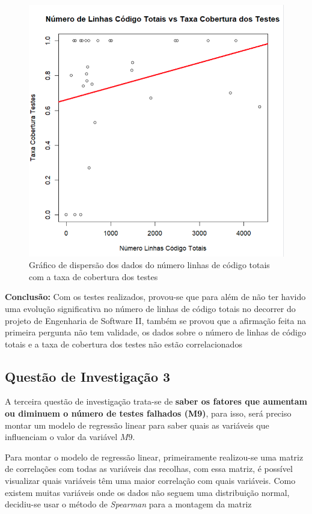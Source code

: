 \documentclass[%
 aip,
cp,  %
 amsmath,amssymb,%
 reprint,%
]{revtex4-2}
\begin{document}
 \begin{figure}[!h]
     \centering
     \includegraphics[width=0.4\linewidth]{imagens//questao2/scatterPlotCorrelacaoPergunta2.png}
     \caption{Gráfico de dispersão dos dados do número linhas de código totais com a taxa de cobertura dos testes}
     \label{fig:ScatterPlotPergunta2}
 \end{figure}
 
\vspace{2cm}

 \textbf{Conclusão:} Com os testes realizados, provou-se que para além de não ter havido uma evolução significativa no número de linhas de código totais no decorrer do projeto de Engenharia de Software II, também se provou que a afirmação feita na primeira pergunta não tem validade, os dados sobre o número de linhas de código totais e a taxa de cobertura dos testes não estão correlacionados


\newpage


\subsection{Questão de Investigação 3}
A terceira questão de investigação trata-se de \textbf{saber os fatores que aumentam ou diminuem o número de testes falhados (M9)}, para isso, será preciso montar um modelo de regressão linear para saber quais as variáveis que influenciam o valor da variável $M9$.


Para montar o modelo de regressão linear, primeiramente realizou-se uma matriz de correlações com todas as variáveis das recolhas, com essa matriz, é possível visualizar quais variáveis têm uma maior correlação com quais variáveis. Como existem muitas variáveis onde os dados não seguem uma distribuição normal, decidiu-se usar o método de \textit{Spearman} para a montagem da matriz
\end{document}

